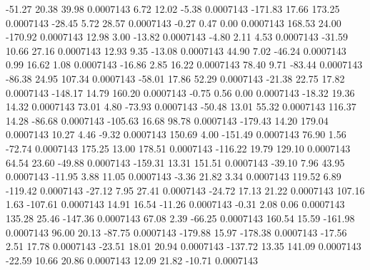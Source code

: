       -51.27       20.38       39.98     0.0007143
        6.72       12.02       -5.38     0.0007143
     -171.83       17.66      173.25     0.0007143
      -28.45        5.72       28.57     0.0007143
       -0.27        0.47        0.00     0.0007143
      168.53       24.00     -170.92     0.0007143
       12.98        3.00      -13.82     0.0007143
       -4.80        2.11        4.53     0.0007143
      -31.59       10.66       27.16     0.0007143
       12.93        9.35      -13.08     0.0007143
       44.90        7.02      -46.24     0.0007143
        0.99       16.62        1.08     0.0007143
      -16.86        2.85       16.22     0.0007143
       78.40        9.71      -83.44     0.0007143
      -86.38       24.95      107.34     0.0007143
      -58.01       17.86       52.29     0.0007143
      -21.38       22.75       17.82     0.0007143
     -148.17       14.79      160.20     0.0007143
       -0.75        0.56        0.00     0.0007143
      -18.32       19.36       14.32     0.0007143
       73.01        4.80      -73.93     0.0007143
      -50.48       13.01       55.32     0.0007143
      116.37       14.28      -86.68     0.0007143
     -105.63       16.68       98.78     0.0007143
     -179.43       14.20      179.04     0.0007143
       10.27        4.46       -9.32     0.0007143
      150.69        4.00     -151.49     0.0007143
       76.90        1.56      -72.74     0.0007143
      175.25       13.00      178.51     0.0007143
     -116.22       19.79      129.10     0.0007143
       64.54       23.60      -49.88     0.0007143
     -159.31       13.31      151.51     0.0007143
      -39.10        7.96       43.95     0.0007143
      -11.95        3.88       11.05     0.0007143
       -3.36       21.82        3.34     0.0007143
      119.52        6.89     -119.42     0.0007143
      -27.12        7.95       27.41     0.0007143
      -24.72       17.13       21.22     0.0007143
      107.16        1.63     -107.61     0.0007143
       14.91       16.54      -11.26     0.0007143
       -0.31        2.08        0.06     0.0007143
      135.28       25.46     -147.36     0.0007143
       67.08        2.39      -66.25     0.0007143
      160.54       15.59     -161.98     0.0007143
       96.00       20.13      -87.75     0.0007143
     -179.88       15.97     -178.38     0.0007143
      -17.56        2.51       17.78     0.0007143
      -23.51       18.01       20.94     0.0007143
     -137.72       13.35      141.09     0.0007143
      -22.59       10.66       20.86     0.0007143
       12.09       21.82      -10.71     0.0007143
